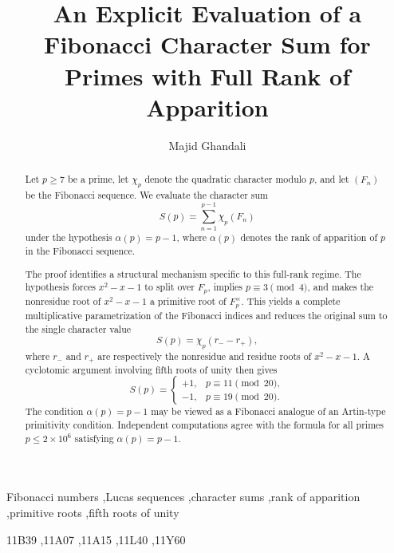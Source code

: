 \documentclass[preprint,12pt]{elsarticle}
\def\tnoteref#1{}%
\def\corref#1{}%
\def\F{F}%
\numberwithin{equation}{section}
\theoremstyle{plain}
\theoremstyle{definition}
\newcommand{\F}{\mathbb{F}}
\begin{document}
\begin{frontmatter}

\title{An Explicit Evaluation of a Fibonacci Character Sum for
Primes with Full Rank of Apparition\tnoteref{tn:preprint}}


\author[inst1]{Majid Ghandali\corref{cor1}}

\address[inst1]{Independent Researcher, Tehran, Iran}

\begin{abstract}
Let $p\ge 7$ be a prime, let $\chi_p$ denote the quadratic
character modulo $p$, and let $(F_n)$ be the Fibonacci sequence.
We evaluate the character sum
\[
S(p)=\sum_{n=1}^{p-1}\chi_p(F_n)
\]
under the hypothesis $\alpha(p)=p-1$, where $\alpha(p)$ denotes
the rank of apparition of $p$ in the Fibonacci sequence.

The proof identifies a structural mechanism specific to this
full-rank regime. The hypothesis forces $x^2-x-1$ to split over
$\F_p$, implies $p\equiv3\pmod4$, and makes the nonresidue root of
$x^2-x-1$ a primitive root of $\F_p^\times$. This yields a complete
multiplicative parametrization of the Fibonacci indices and reduces
the original sum to the single character value
\[
S(p)=\chi_p(r_- - r_+),
\]
where $r_-$ and $r_+$ are respectively the nonresidue and residue
roots of $x^2-x-1$. A cyclotomic argument involving fifth roots of
unity then gives
\[
S(p)=
\begin{cases}
+1,&p\equiv11\pmod{20},\\
-1,&p\equiv19\pmod{20}.
\end{cases}
\]
The condition $\alpha(p)=p-1$ may be viewed as a Fibonacci analogue
of an Artin-type primitivity condition. Independent computations
agree with the formula for all primes $p\le2\times10^6$ satisfying
$\alpha(p)=p-1$.
\end{abstract}

\begin{keyword}
Fibonacci numbers \sep Lucas sequences \sep character sums
\sep rank of apparition \sep primitive roots \sep fifth roots of unity

\MSC[2020] 11B39 \sep 11A07 \sep 11A15 \sep 11L40 \sep 11Y60
\end{keyword}

\end{frontmatter}
\end{document}
